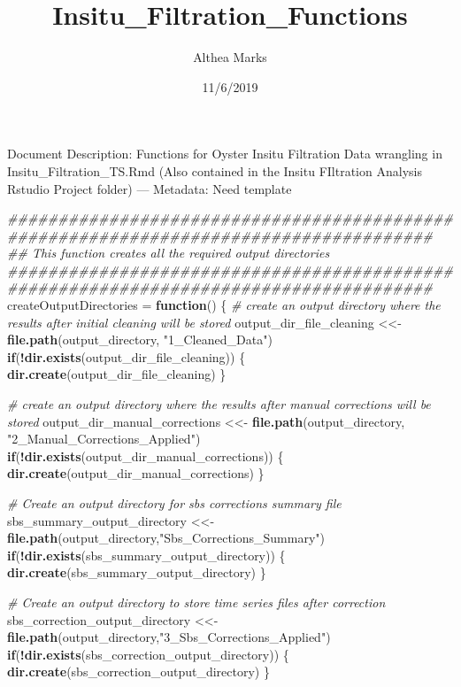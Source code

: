 \documentclass[]{article}
\title{Insitu\_Filtration\_Functions}
\author{Althea Marks}
\date{11/6/2019}
\newenvironment{Shaded}{\begin{snugshade}}{\end{snugshade}}
\newcommand{\CommentTok}[1]{\textcolor[rgb]{0.56,0.35,0.01}{\textit{#1}}}
\newcommand{\ControlFlowTok}[1]{\textcolor[rgb]{0.13,0.29,0.53}{\textbf{#1}}}
\newcommand{\KeywordTok}[1]{\textcolor[rgb]{0.13,0.29,0.53}{\textbf{#1}}}
\newcommand{\NormalTok}[1]{#1}
\newcommand{\OperatorTok}[1]{\textcolor[rgb]{0.81,0.36,0.00}{\textbf{#1}}}
\newcommand{\StringTok}[1]{\textcolor[rgb]{0.31,0.60,0.02}{#1}}
\begin{document}
\maketitle

Document Description: Functions for Oyster Insitu Filtration Data
wrangling in Insitu\_Filtration\_TS.Rmd (Also contained in the Insitu
FIltration Analysis Rstudio Project folder) --- Metadata: Need template

\begin{Shaded}
\begin{Highlighting}[]
\CommentTok{######################################################################################}
\CommentTok{## This function creates all the required output directories}
\CommentTok{######################################################################################}
\NormalTok{createOutputDirectories =}\StringTok{ }\ControlFlowTok{function}\NormalTok{()}
\NormalTok{\{}
  \CommentTok{# create an output directory where the results after initial cleaning will be stored}
\NormalTok{  output_dir_file_cleaning <<-}\StringTok{ }\KeywordTok{file.path}\NormalTok{(output_directory, }\StringTok{"1_Cleaned_Data"}\NormalTok{)}
  \ControlFlowTok{if}\NormalTok{(}\OperatorTok{!}\KeywordTok{dir.exists}\NormalTok{(output_dir_file_cleaning))}
\NormalTok{  \{}
    \KeywordTok{dir.create}\NormalTok{(output_dir_file_cleaning)}
\NormalTok{  \}}
  
  \CommentTok{# create an output directory where the results after manual corrections will be stored}
\NormalTok{  output_dir_manual_corrections <<-}\StringTok{ }\KeywordTok{file.path}\NormalTok{(output_directory, }\StringTok{"2_Manual_Corrections_Applied"}\NormalTok{)}
  \ControlFlowTok{if}\NormalTok{(}\OperatorTok{!}\KeywordTok{dir.exists}\NormalTok{(output_dir_manual_corrections))}
\NormalTok{  \{}
    \KeywordTok{dir.create}\NormalTok{(output_dir_manual_corrections)}
\NormalTok{  \}}
  
  \CommentTok{# Create an output directory for sbs corrections summary file }
\NormalTok{  sbs_summary_output_directory <<-}\StringTok{ }\KeywordTok{file.path}\NormalTok{(output_directory,}\StringTok{"Sbs_Corrections_Summary"}\NormalTok{)}
  \ControlFlowTok{if}\NormalTok{(}\OperatorTok{!}\KeywordTok{dir.exists}\NormalTok{(sbs_summary_output_directory))}
\NormalTok{  \{}
    \KeywordTok{dir.create}\NormalTok{(sbs_summary_output_directory)}
\NormalTok{  \}}
  
  \CommentTok{# Create an output directory to store time series files after correction}
\NormalTok{  sbs_correction_output_directory <<-}\StringTok{ }\KeywordTok{file.path}\NormalTok{(output_directory,}\StringTok{"3_Sbs_Corrections_Applied"}\NormalTok{)}
  \ControlFlowTok{if}\NormalTok{(}\OperatorTok{!}\KeywordTok{dir.exists}\NormalTok{(sbs_correction_output_directory))}
\NormalTok{  \{}
    \KeywordTok{dir.create}\NormalTok{(sbs_correction_output_directory)}
\NormalTok{  \}}
  

\end{Highlighting}
\end{Shaded}
\end{document}
